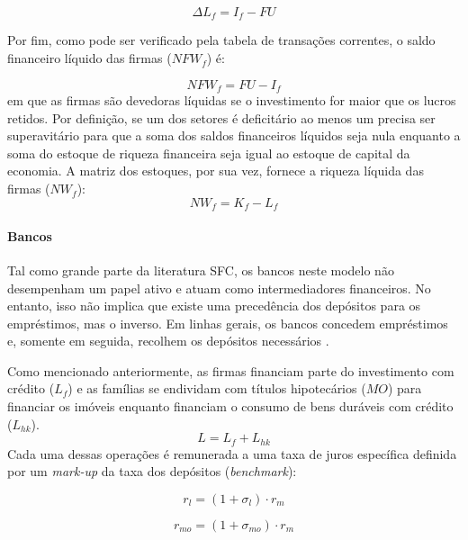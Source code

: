 \begin{equation}
    \Delta L_f = I_f - FU
\end{equation}

Por fim, como pode ser verificado pela tabela de transações correntes, o saldo financeiro líquido das firmas ($NFW_f$) é:

\begin{equation}
    NFW_f = FU - I_f
\end{equation}
em que as firmas são devedoras líquidas se o investimento for maior que os lucros retidos. Por definição, se um dos setores é deficitário ao menos um precisa ser superavitário para que a soma dos saldos financeiros líquidos seja nula enquanto a soma do estoque de riqueza financeira seja igual ao estoque de capital da economia. A matriz dos estoques, por sua vez, fornece a riqueza líquida das firmas ($NW_f$):
\begin{equation}
    NW_f = K_f - L_f
\end{equation}

\paragraph*{Bancos} Tal como grande parte da literatura SFC, os bancos neste modelo não desempenham um papel ativo e atuam como intermediadores financeiros. No entanto, isso não implica que existe uma precedência dos depósitos para os empréstimos, mas o inverso. Em linhas gerais, os bancos concedem empréstimos e, somente em seguida, recolhem os depósitos necessários \cite{le_bourva_money_1992}. 

Como mencionado anteriormente, as firmas financiam parte do investimento com crédito ($L_f$) e as famílias se endividam com títulos hipotecários ($MO$) para financiar os imóveis enquanto financiam o consumo de bens duráveis com crédito ($L_{hk}$). 
\begin{equation}
L = L_f + L_{hk}
\end{equation}
Cada uma dessas operações é remunerada a uma taxa de juros específica definida por um \textit{mark-up} da taxa dos depósitos (\textit{benchmark}):

\begin{equation}
    r_l = (1+\sigma_l)\cdot r_m
\end{equation}

\begin{equation}
    r_{mo} = (1+\sigma_{mo})\cdot r_m
\end{equation}

